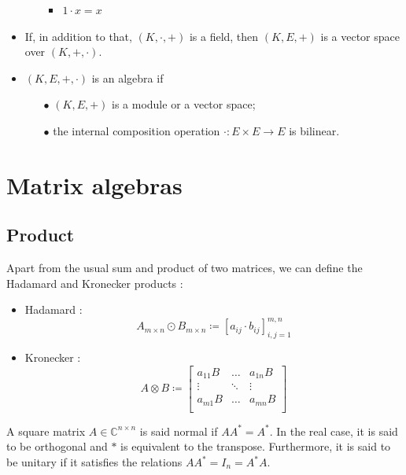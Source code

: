 \documentclass[12pt, openany]{report}
\theoremstyle{definition}
\begin{document}
\begin{itemize}
\begin{itemize}
\begin{itemize}
            \item \(1\cdot x = x\)
        \end{itemize}
    \end{itemize}
    \item If, in addition to that, \((K,\cdot,+)\) is a field, then \((K,E,+)\) is a vector space over \((K,+,\cdot)\).
    \item \((K,E,+,\cdot)\) is an algebra if 
    \begin{itemize}
        \item [\(\bullet\)] \((K,E,+)\) is a module or a vector space;
        \item [\(\bullet\)] the internal composition operation \(\cdot:E\times E\rightarrow E\) is bilinear.
    \end{itemize}
\end{itemize}
\section{Matrix algebras}
\subsection{Product}
Apart from the usual sum and product of two matrices, we can define the Hadamard and Kronecker products :
\begin{itemize}
    \item Hadamard : \[A_{m\times n}\odot B_{m\times n} \coloneqq [a_{ij}\cdot b_{ij}]_{i,j=1}^{m,n}\]
    \item Kronecker : \[A \otimes B \coloneqq \begin{bmatrix}
        a_{11}B & \dots & a_{1n}B\\
        \vdots & \ddots & \vdots \\
        a_{m1}B & \dots & a_{mn}B\\
    \end{bmatrix}\]
\end{itemize}
A square matrix \(A\in \mathbb{C}^{n\times n}\) is said normal if \(AA^* = A^*\). In the real case, it is said to be orthogonal and \(*\) is equivalent to the transpose. Furthermore, it is said to be unitary if it satisfies the relations \(AA^* = I_n = A^*A\). 
\end{document}
